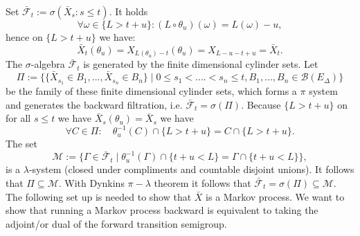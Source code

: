 \documentclass[a4paper,12pt,twoside]{article}
\begin{document}
Set $\bar{\mathcal{F}}_t := \sigma (\bar{X}_s : s \leq t)$. It holds 
\[
\forall \omega \in \{ L> t+u \}: (L\circ \theta_u)(\omega) = L(\omega) -u,
\]
hence on $\{ L> t+u \}$ we have:
\[
\bar{X}_t (\theta_u)= X_{L(\theta_u)-t} (\theta_u) = X_{L-u-t+u} = \bar{X}_t.
\]
The $\sigma$-algebra $\bar{\mathcal{F}}_t$ is generated by the finite dimensional cylinder sets. Let
\[
\Pi := \{ \{ \bar{X}_{s_1}\in B_1,...,\bar{X}_{s_n} \in B_n  \} \mid 0 \leq s_1  <....< s_n \leq t, B_1 ,...,B_n \in \mathcal{B}(E_\Delta)  \}
\]
be the family of these finite dimensional cylinder sets, which forms a $\pi$ system and generates the backward filtration, i.e. $\bar{\mathcal{F}}_t = \sigma (\Pi)$. Because $\{ L> t+u \}$ on for all $s \leq t$ we have $\bar{X}_s (\theta_u) = \bar{X}_s$ we have 
\[
\forall C \in \Pi: \quad \theta_u^{-1} (C) \cap \{ L> t+u \} = C \cap \{ L> t+u \}.
\]
The set 
\[
\mathcal{M} := \{ \Gamma \in \bar{\mathcal{F}}_t \mid \theta_u^{-1} (\Gamma) \cap \{ t+ u< L \} = \Gamma \cap \{ t+ u < L \} \},
\]
is a $\lambda$-system (closed under compliments and countable disjoint unions). It follows that $\Pi \subseteq \mathcal{M}$. With Dynkins $\pi- \lambda$ theorem it follows that $\bar{\mathcal{F}}_t =\sigma (\Pi) \subseteq \mathcal{M}$.\\
The following set up is needed to show that $\bar{X}$ is a Markov process. We want to show that running a Markov process backward is equivalent to taking the adjoint/or dual of the forward transition semigroup. 
\end{document}
